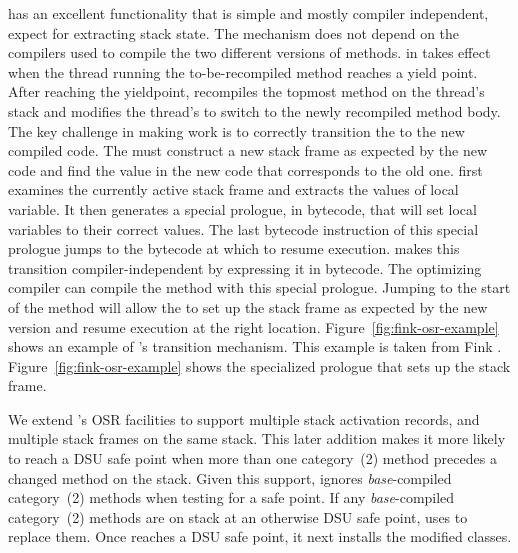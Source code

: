 \RVM has an excellent \OSR{} functionality \cite{osr} that is
simple and mostly compiler independent, expect for extracting stack state. The \OSR mechanism does not depend
on the compilers used to compile the two different versions of methods.
\OSR in \RVM takes effect when the thread running the to-be-recompiled
method reaches a yield point. After reaching the yieldpoint, \RVM
recompiles the topmost method on the thread's stack and modifies the
thread's \PC to switch to the newly recompiled method body. The key
challenge in making \OSR work is to correctly transition the \PC to the new
compiled code. The \VM must construct a new stack frame as expected by the
new code and find the \PC value in the new code that corresponds to the old
one. \RVM first examines the currently active stack frame and extracts
the values of local variable. It then generates a special prologue, in
bytecode, that will set local variables to their correct values. The last
bytecode instruction of this special prologue jumps to the bytecode at which to
resume execution. \RVM makes this transition
compiler-independent by expressing it in bytecode. The optimizing compiler
can compile the method with this special prologue. Jumping to the start
of the method will allow the \VM to set up the stack frame as expected by the
new version and resume execution at the right location.
Figure~\ref{fig:fink-osr-example} shows an example of \RVM's \OSR
transition mechanism. This example is taken from Fink \EA \cite{osr}.
Figure~\ref{fig:fink-osr-example} shows the specialized prologue that sets
up the stack frame.

We  extend \RVM's OSR facilities to support multiple stack activation
records, and multiple stack frames on the same stack. This later addition
makes it more likely to reach a DSU safe point when more than one
category~(2) method precedes a changed method on the stack.  Given this
support, \JV ignores \emph{base}-compiled category~(2) methods when
testing for a safe point.  If any \emph{base}-compiled category~(2) methods
are on stack at an otherwise DSU safe point, \JV uses \OSR to replace
them. Once \JV reaches a DSU safe point, it next installs the modified
classes.

